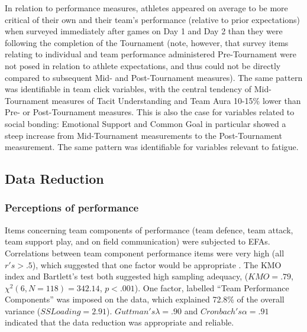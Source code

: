 \begin{CJK}{UTF8}{gbsn}
In relation to performance measures, athletes appeared on average to be more critical of their own and their team's performance (relative to prior expectations) when surveyed immediately after games on Day 1 and Day 2 than they were following the completion of the Tournament (note, however, that survey items relating to individual and team performance administered Pre-Tournament were not posed in relation to athlete expectations, and thus could not be directly compared to subsequent Mid- and Post-Tournament measures).  The same pattern was identifiable in team click variables, with the central tendency of Mid-Tournament measures of Tacit Understanding and Team Aura 10-15\% lower than Pre- or Post-Tournament measures.  This is also the case for variables related to social bonding: Emotional Support and Common Goal in particular showed a steep increase from Mid-Tournament measurements to the Post-Tournament measurement.  The same pattern was identifiable for variables relevant to fatigue.














\subsection{Data Reduction\label{Ch5:dataReduction}}


\subsubsection{Perceptions of performance}

Items concerning team components of performance (team defence, team attack, team support play, and on field communication) were subjected to EFAs.  Correlations between team component performance items were very high (all $r's > .5$), which suggested that one factor would be appropriate . The KMO index and Bartlett's test both suggested high sampling adequacy, ($KMO = .79$, $\chi^2(6, N = 118) = 342.14$, $p < .001$).  One factor, labelled ``Team Performance Components'' was imposed on the data, which explained 72.8\% of the overall variance ($SS Loading = 2.91$). $Guttman's \lambda =.90$ and $Cronbach's \alpha = .91$ indicated that the data reduction was appropriate and reliable.


\end{CJK}
